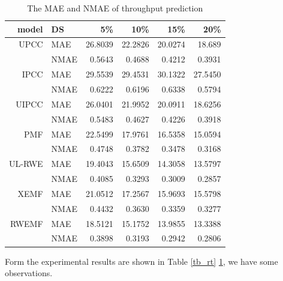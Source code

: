 \documentclass[conference]{IEEEtran}
\begin{document}
\begin{table}[H]
  \centering
  \caption{The MAE and NMAE of throughput prediction}
  \label{tb_tp}
    \begin{tabular}{r||l|rrrr}
\hline
model & DS & 5\% & 10\% & 15\% & 20\% \\
\hline
UPCC & MAE & 26.8039 & 22.2826 & 20.0274 & 18.689 \\
   & NMAE & 0.5643 & 0.4688 & 0.4212 & 0.3931 \\
\hline
IPCC & MAE & 29.5539 & 29.4531 & 30.1322 & 27.5450 \\
   & NMAE & 0.6222 & 0.6196 & 0.6338 & 0.5794 \\
\hline
UIPCC & MAE & 26.0401 & 21.9952 & 20.0911 & 18.6256 \\
   & NMAE & 0.5483 & 0.4627 & 0.4226 & 0.3918 \\
\hline
PMF & MAE & 22.5499 & 17.9761 & 16.5358 & 15.0594 \\
   & NMAE & 0.4748 & 0.3782 & 0.3478 & 0.3168 \\
\hline
UL-RWE & MAE & 19.4043 & 15.6509 & 14.3058 & 13.5797 \\
   & NMAE & 0.4085 & 0.3293 & 0.3009 & 0.2857 \\
\hline
XEMF & MAE & 21.0512 & 17.2567 & 15.9693 & 15.5798 \\
   & NMAE & 0.4432 & 0.3630 & 0.3359 & 0.3277 \\
\hline
RWEMF & MAE & 18.5121 & 15.1752 & 13.9855 & 13.3388 \\
   & NMAE & 0.3898 & 0.3193 & 0.2942 & 0.2806 \\
\hline
    \end{tabular}
\end{table}

\par Form the experimental results are shown in Table \ref{tb_rt} \ref{tb_tp}, we have some observations. 
\end{document}
